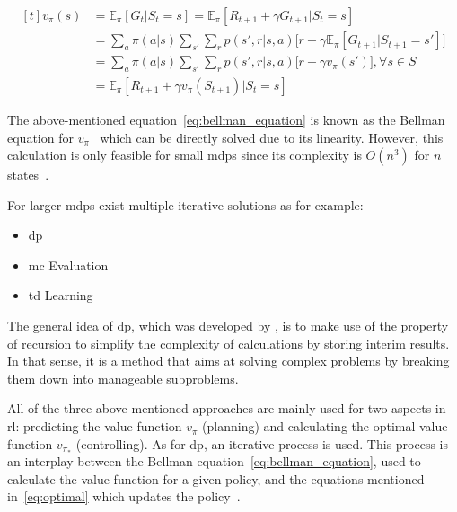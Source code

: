 \documentclass[draft,final]{vutinfth} %
\newcommand{\p}[1]{see p. #1}
\begin{document}
    \begin{equation}
        \begin{aligned}[t]
            v_\pi(s) &= \mathbb{E}_\pi[G_t|S_t=s] = \mathbb{E}_\pi[R_{t+1} + \gamma G_{t+1}|S_t=s] \\
            &  =  \sum_{a} \pi(a|s) \sum_{s'}\sum_{r} p(s',r|s,a) \bigg[r + \gamma \mathbb{E}_\pi[G_{t+1}|S_{t+1} = s'] \bigg] \\
            &  =  \sum_{a} \pi(a|s) \sum_{s'}\sum_{r} p(s',r|s,a) \bigg[r + \gamma v_{\pi}(s') \bigg], \forall s \in \mathit{S} \\
            &  =  \mathbb{E}_\pi[R_{t+1} + \gamma v_\pi(S_{t+1})|S_t=s]
            \label{eq:bellman_equation}
        \end{aligned}
    \end{equation}

    The above-mentioned equation~\eqref{eq:bellman_equation} is known as the Bellman equation for $v_\pi$~\citep[\p{59}]{sutton_reinforcement_2018} which can be directly solved due to its linearity.
    However, this calculation is only feasible for small \glspl{mdp} since its complexity is $O(n^3)$ for $n$ states~.

    For larger \glspl{mdp} exist multiple iterative solutions as for example:
    \begin{itemize}
        \item \gls{dp}
        \item \gls{mc} Evaluation
        \item \gls{td} Learning
    \end{itemize}

    The general idea of \gls{dp}, which was developed by \citeauthor{bellman_theory_1954}, is to make use of the property of recursion to simplify the complexity of calculations by storing interim results.
    In that sense, it is a method that aims at solving complex problems by breaking them down into manageable subproblems.

    All of the three above mentioned approaches are mainly used for two aspects in \gls{rl}: predicting the value function $v_\pi$ (planning) and calculating the optimal value function $v_{\pi_*}$ (controlling).
    As for \gls{dp}, an iterative process is used.
    This process is an interplay between the Bellman equation~\eqref{eq:bellman_equation}, used to calculate the value function for a given policy, and the equations mentioned in~\eqref{eq:optimal} which updates the policy~.
\end{document}
